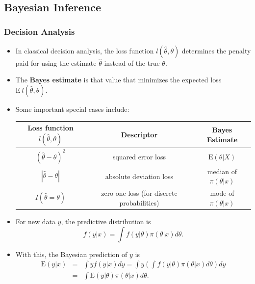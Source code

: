 \documentclass{beamer}
\begin{document}
\subsection{Bayesian Inference}

\begin{frame}[shrink=2]
\frametitle{Decision Analysis}
\begin{itemize}
\item In classical decision analysis, the loss function $l(\hat{\theta}, \theta)$ determines the penalty paid for using the estimate $\hat{\theta}$ instead of the true $\theta$.
\item The \textbf{Bayes estimate} is that value that minimizes the expected loss $\mathrm{E~}l(\hat{\theta}, \theta)$.
\item Some important special cases include:
\begin{table}[H]\begin{center}\begin{tabular}{ccc}  \hline
Loss function $l(\hat{\theta}, \theta)$ & Descriptor & Bayes Estimate\\ \hline
$(\hat{\theta}- \theta)^2$ & squared error loss & $\mathrm{E}(\theta|X) $ \\
$|\hat{\theta}- \theta|$ & absolute deviation loss & median of $\pi(\theta|x)$\\
$I(\hat{\theta} =\theta)$ & zero-one loss (for discrete probabilities)& mode of $\pi(\theta|x)$ \\  \hline
\end{tabular}\end{center}\end{table}
\item For new data $y$, the predictive distribution is
$$ f(y|x) = \int f(y|\theta) \pi(\theta|x) d\theta .$$
\item With this, the Bayesian prediction of $y$ is
\begin{eqnarray*}
\mathrm{E}(y|x) &=& \int y f(y|x) dy = \int y \left(\int f(y|\theta) \pi(\theta|x) d\theta \right) dy \\
&=& \int  \mathrm{E}(y|\theta) \pi(\theta|x) d\theta .
\end{eqnarray*}
\end{itemize}
\end{frame}
\end{document}
